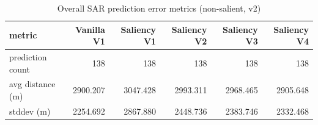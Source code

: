 \begin{table}[ht]
\centering
\caption{Overall SAR prediction error metrics (non-salient, v2)}
\label{tab:sar-overall-errors-non-salient,-v2}
\begin{tabular}{lrrrrr}
\hline
metric & Vanilla V1 & Saliency V1 & Saliency V2 & Saliency V3 & Saliency V4 \\
\hline
prediction count & 138 & 138 & 138 & 138 & 138 \\
avg distance (m) & 2900.207 & 3047.428 & 2993.311 & 2968.465 & 2905.648 \\
stddev (m) & 2254.692 & 2867.880 & 2448.736 & 2383.746 & 2332.468 \\
\hline
\end{tabular}
\end{table}
